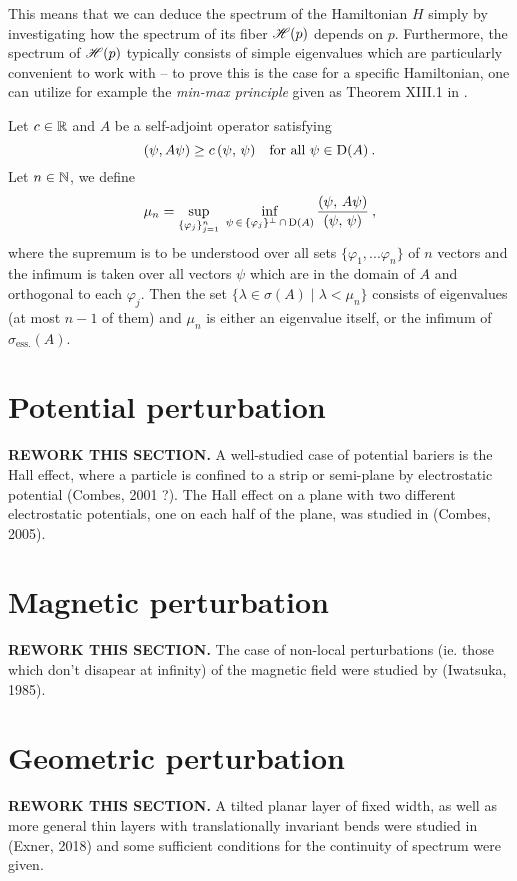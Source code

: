 This means that we can deduce the spectrum of the Hamiltonian $H$ simply by investigating how the spectrum of its fiber $\mathscr{H}(p)$ depends on $p$. Furthermore, the spectrum of $\mathscr{H}(p)$ typically consists of simple eigenvalues which are particularly convenient to work with – to prove this is the case for a specific Hamiltonian, one can utilize for example the \textit{min-max principle} given as Theorem XIII.1 in \cite{ReedSimon4}.

\begin{thm}
    \label{thm-minmax}
    Let $c \in \mathbb{R}$ and $A$ be a self-adjoint operator satisfying
    \begin{equation*}
        (\psi, A \psi) \geq c \, (\psi, \, \psi)
        \quad \text{for all }
        \psi \in \mathrm{D}(A) \: .
    \end{equation*}
    Let $n \in \mathbb{N}$, we define
    \begin{equation*}
        \mu_n =
        \sup_{\{ \varphi_j \}_{j=1}^n} \;
        \inf_{\psi \, \in \, \{ \varphi_j \}^\perp \, \cap \, \mathrm{D}(A)}
        \frac{ (\psi, \, A\psi) }{ (\psi, \, \psi) }
        \: ,
    \end{equation*}
    where the supremum is to be understood over all sets $\{ \varphi_1, ... \varphi_n \}$ of $n$ vectors and the infimum is taken over all vectors $\psi$ which are in the domain of $A$ and orthogonal to each $\varphi_j$. Then the set $\{ \lambda \in \sigma(A) \; | \; \lambda < \mu_n \}$ consists of eigenvalues (at most $n-1$ of them) and $\mu_n$ is either an eigenvalue itself, or the infimum of~$\sigma_{\mathrm{ess.}}(A)$.
\end{thm}


\section{Potential perturbation}
\textbf{REWORK THIS SECTION.} A well-studied case of potential bariers is the Hall effect, where a particle is confined to a strip or semi-plane by electrostatic potential (Combes, 2001 ?). The Hall effect on a plane with two different electrostatic potentials, one on each half of the plane, was studied in (Combes, 2005).

\section{Magnetic perturbation}
\textbf{REWORK THIS SECTION.} The case of non-local perturbations (ie. those which don't disapear at infinity) of the magnetic field were studied by (Iwatsuka, 1985).

\section{Geometric perturbation}
\textbf{REWORK THIS SECTION.} A tilted planar layer of fixed width, as well as more general thin layers with translationally invariant bends were studied in (Exner, 2018) and some sufficient conditions for the continuity of spectrum were given.
